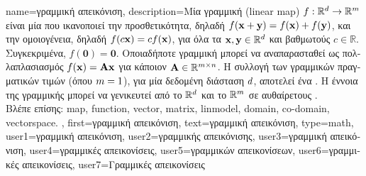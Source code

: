{name={\foreignlanguage{greek}{γραμμική απεικόνιση}},
	description={\foreignlanguage{greek}{Μία γραμμική}  (linear map)
		$f: \mathbb{R}^d \rightarrow \mathbb{R}^m$ \foreignlanguage{greek}{είναι μία}  \foreignlanguage{greek}{που 
		ικανοποιεί την προσθετικότητα, δηλαδή $f({\bf x} + {\bf y}) = f({\bf x}) + f({\bf y})$, και την ομοιογένεια, δηλαδή $f(c{\bf x}) = c f({\bf x})$, για όλα τα} 
		 ${\bf x}, {\bf y} \in \mathbb{R}^d$ \foreignlanguage{greek}{και βαθμωτούς $c \in \mathbb{R}$. Συγκεκριμένα, 
		$f(\mathbf{0}) = \mathbf{0}$. Οποιαδήποτε γραμμική}  \foreignlanguage{greek}{μπορεί να αναπαρασταθεί ως πολλαπλασιασμός} 
		 $f({\bf x}) = {\bf A} {\bf x}$ \foreignlanguage{greek}{για κάποιον}  ${\bf A} \in \mathbb{R}^{m \times n}$. 
		\foreignlanguage{greek}{Η συλλογή των γραμμικών}  \foreignlanguage{greek}{πραγματικών τιμών (όπου $m=1$), 
		για μία δεδομένη διάσταση $d$, αποτελεί ένα} . \foreignlanguage{greek}{Η έννοια της γραμμικής}  
		\foreignlanguage{greek}{μπορεί να γενικευτεί από το}  $\mathbb{R}^{d}$ \foreignlanguage{greek}{και το}
		 $\mathbb{R}^{m}$ \foreignlanguage{greek}{σε αυθαίρετους} .
		\\
		\foreignlanguage{greek}{Βλέπε επίσης:} \gls{map}, \gls{function}, \gls{vector}, \gls{matrix}, \gls{linmodel}, \gls{domain}, \gls{co-domain}, \gls{vectorspace}. },
	first={\foreignlanguage{greek}{γραμμική απεικόνιση}},
	text={\foreignlanguage{greek}{γραμμική απεικόνιση}},
	type=math,
	user1={\foreignlanguage{greek}{γραμμική απεικόνιση}}, %
  	user2={\foreignlanguage{greek}{γραμμικής απεικόνισης}}, %
	user3={\foreignlanguage{greek}{γραμμική απεικόνιση}}, %
	user4={\foreignlanguage{greek}{γραμμικές απεικονίσεις}}, %
  	user5={\foreignlanguage{greek}{γραμμικών απεικονίσεων}}, %
	user6={\foreignlanguage{greek}{γραμμικές απεικονίσεις}}, %
	user7={\foreignlanguage{greek}{Γραμμικές απεικονίσεις}} %
}

